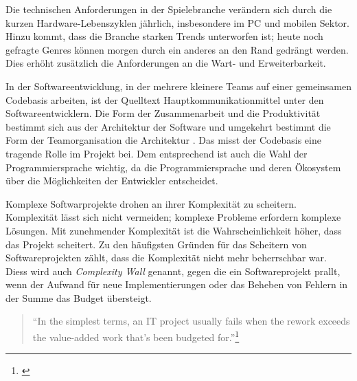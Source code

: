 Die technischen Anforderungen in der Spielebranche verändern sich durch die kurzen Hardware-Lebenszyklen jährlich, insbesondere im PC und mobilen Sektor. Hinzu kommt, dass die Branche starken Trends unterworfen ist; heute noch gefragte Genres können morgen durch ein anderes an den Rand gedrängt werden. Dies erhöht zusätzlich die Anforderungen an die Wart- und Erweiterbarkeit.

In der Softwareentwicklung, in der mehrere kleinere Teams auf einer gemeinsamen Codebasis arbeiten, ist der Quelltext Hauptkommunikationmittel unter den Softwareentwicklern. Die Form der Zusammenarbeit und die Produktivität bestimmt sich aus der Architektur der Software und umgekehrt bestimmt die Form der Teamorganisation die Architektur \parencite[Foreword, Seite xix u. Kapitel 1, Seite 13f]{Martin2008}. Das misst der Codebasis eine tragende Rolle im Projekt bei. Dem entsprechend ist auch die Wahl der Programmiersprache wichtig, da die Programmiersprache und deren Ökosystem über die Möglichkeiten der Entwickler entscheidet.

Komplexe Softwarprojekte drohen an ihrer Komplexität zu scheitern. Komplexität lässt sich nicht vermeiden; komplexe Probleme erfordern komplexe Lösungen. Mit zunehmender Komplexität ist die Wahrscheinlichkeit höher, dass das Projekt scheitert. Zu den häufigsten Gründen für das Scheitern von Softwareprojekten zählt, dass die Komplexität nicht mehr beherrschbar war. Diess wird auch \textit{Complexity Wall} genannt, gegen die ein Softwareprojekt prallt, wenn der Aufwand für neue Implementierungen oder das Beheben von Fehlern in der Summe das Budget übersteigt.

\begin{quote}
"`In the simplest terms, an IT project usually fails when the rework exceeds the value-added work that's been budgeted for."'\footnote{\parencite[Vgl. Abschnitt: "`Why do projects fail so often?"']{Charette2005}}
\end{quote}








